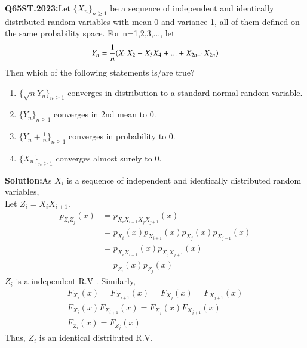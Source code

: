 \documentclass[journal,12pt,Twocolumn]{IEEEtran}
\theoremstyle{remark}
\begin{document}

\textbf{Q65ST.2023:}Let $\{X_n\}_{n \geq 1}$ be a sequence of independent and identically distributed random variables with mean 0 and variance 1, all of them defined on the same
probability space. For n=1,2,3,..., let
\begin{align}
Y_n=\frac{1}{n}{\left(X_1X_2+X_3X_4+...+X_{2n-1}X_{2n}\right)} 
\end{align}
Then which of the following statements is/are true? 
\begin{enumerate}[label=(\Alph*)]
\item $\{\sqrt{n}Y_n\}_{n \geq 1}$ converges in distribution to a standard normal random variable.
\item $\{Y_n\}_{n \geq 1}$ converges in 2nd mean to 0.
\item $\{Y_n+\frac{1}{n}\}_{n \geq 1}$ converges in probability to 0.
\item $\{X_n\}_{n \geq 1}$ converges almost surely to 0.
\end{enumerate}
\textbf{Solution:}As $X_i$ is a sequence of independent and identically distributed random variables, \\
Let $Z_i = X_iX_{i+1}$. \\ 
\begin{align}
p_{Z_iZ_j}(x)&=p_{X_iX_{i+1}X_jX_{j+1}}(x) \\ 
&= p_{X_i}(x)p_{X_{i+1}}(x)p_{X_j}(x)p_{X_{j+1}}(x) \\
&= p_{X_iX_{i+1}}(x)p_{X_jX_{j+1}}(x) \\
&= p_{Z_i}(x)p_{Z_j}(x)
\end{align}
$Z_i$ is a independent R.V . Similarly,
\begin{align}
F_{X_i}(x) = F_{X_{i+1}}(x) = F_{X_j}(x) = F_{X_{j+1}}(x) \\
F_{X_i}(x)F_{X_{i+1}}(x) = F_{X_j}(x)F_{X_{j+1}}(x) \\
F_{Z_i}(x) = F_{Z_j}(x)
\end{align}
Thus, $Z_i$ is an identical distributed R.V. \\
\end{document}
